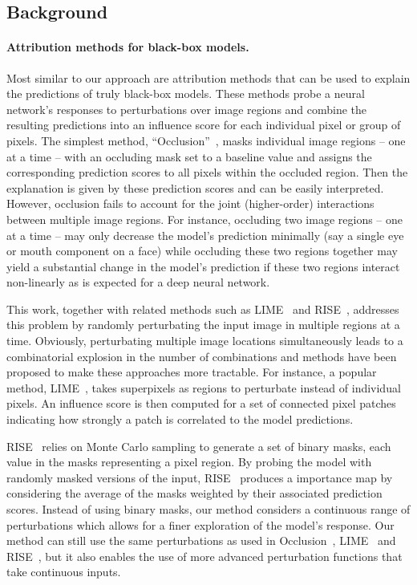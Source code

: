 \subsection{Background}
\label{sobol:sec:related_work}

\paragraph{Attribution methods for black-box models.} Most similar to our approach are attribution methods that can be used to explain the predictions of truly black-box models.
These methods probe a neural network's responses to perturbations over image regions and combine the resulting predictions into an influence score for each individual pixel or group of pixels.
The simplest method, ``Occlusion''~\cite{zeiler2014visualizing}, masks individual image regions -- one at a time -- with an occluding mask set to a baseline value and assigns the corresponding prediction scores to all pixels within the occluded region. Then the explanation is given by these prediction scores and can be easily interpreted.
However, occlusion fails to account for the joint (higher-order) interactions between multiple image regions. For instance, occluding two image regions -- one at a time -- may only decrease the model's prediction minimally (say a single eye or mouth component on a face)  while occluding these two  regions together may yield a substantial change in the model's prediction if these two regions interact non-linearly as is expected for a deep neural network.

This work, together with related methods such as LIME~\cite{ribeiro2016lime} and RISE~\cite{petsiuk2018rise}, addresses this problem by randomly perturbating the input image in multiple regions at a time. Obviously, perturbating multiple image locations simultaneously leads to a combinatorial explosion in the number of combinations and methods have been proposed to make these approaches more tractable.
For instance, a popular method, LIME~\cite{ribeiro2016lime}, takes superpixels as regions to perturbate instead of individual pixels.
An influence score is then computed for a set of connected pixel patches indicating how strongly a patch is correlated to the model predictions.

RISE~\cite{petsiuk2018rise} relies on Monte Carlo sampling to generate a set of binary masks, each value in the masks representing a pixel region.
By probing the model with  randomly masked versions of the input, RISE~\cite{petsiuk2018rise} produces a importance map by considering the average of the masks weighted by their associated prediction scores.
Instead of using binary masks, our method considers a continuous range of perturbations which allows for a finer exploration of the model's response.
Our method can still use the same perturbations as used in Occlusion~\cite{zeiler2014visualizing}, LIME~\cite{ribeiro2016lime} and RISE~\cite{petsiuk2018rise}, but it also enables the use of more advanced perturbation functions that take continuous inputs.

